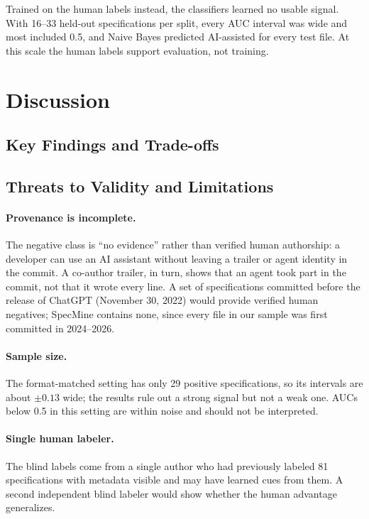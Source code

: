 \documentclass{article}
\begin{document}
Trained on the human labels instead, the classifiers learned no usable signal. With 16--33 held-out specifications per split, every AUC interval was wide and most included 0.5, and Naive Bayes predicted AI-assisted for every test file. At this scale the human labels support evaluation, not training.

\section{Discussion}
\subsection{Key Findings and Trade-offs}

\subsection{Threats to Validity and Limitations}
\paragraph{Provenance is incomplete.} The negative class is ``no evidence'' rather than verified human authorship: a developer can use an AI assistant without leaving a trailer or agent identity in the commit. A co-author trailer, in turn, shows that an agent took part in the commit, not that it wrote every line. A set of specifications committed before the release of ChatGPT (November 30, 2022) would provide verified human negatives; SpecMine contains none, since every file in our sample was first committed in 2024--2026.

\paragraph{Sample size.} The format-matched setting has only 29 positive specifications, so its intervals are about $\pm 0.13$ wide; the results rule out a strong signal but not a weak one. AUCs below 0.5 in this setting are within noise and should not be interpreted.

\paragraph{Single human labeler.} The blind labels come from a single author who had previously labeled 81 specifications with metadata visible and may have learned cues from them. A second independent blind labeler would show whether the human advantage generalizes.
\end{document}
